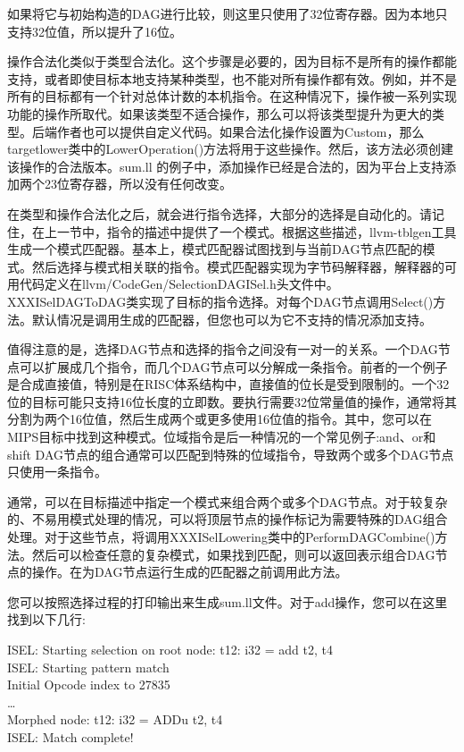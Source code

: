 如果将它与初始构造的DAG进行比较，则这里只使用了32位寄存器。因为本地只支持32位值，所以提升了16位。\par

操作合法化类似于类型合法化。这个步骤是必要的，因为目标不是所有的操作都能支持，或者即使目标本地支持某种类型，也不能对所有操作都有效。例如，并不是所有的目标都有一个针对总体计数的本机指令。在这种情况下，操作被一系列实现功能的操作所取代。如果该类型不适合操作，那么可以将该类型提升为更大的类型。后端作者也可以提供自定义代码。如果合法化操作设置为Custom，那么targetlower类中的LowerOperation()方法将用于这些操作。然后，该方法必须创建该操作的合法版本。sum.ll 的例子中，添加操作已经是合法的，因为平台上支持添加两个23位寄存器，所以没有任何改变。\par

在类型和操作合法化之后，就会进行指令选择，大部分的选择是自动化的。请记住，在上一节中，指令的描述中提供了一个模式。根据这些描述，llvm-tblgen工具生成一个模式匹配器。基本上，模式匹配器试图找到与当前DAG节点匹配的模式。然后选择与模式相关联的指令。模式匹配器实现为字节码解释器，解释器的可用代码定义在llvm/CodeGen/SelectionDAGISel.h头文件中。XXXISelDAGToDAG类实现了目标的指令选择。对每个DAG节点调用Select()方法。默认情况是调用生成的匹配器，但您也可以为它不支持的情况添加支持。\par

值得注意的是，选择DAG节点和选择的指令之间没有一对一的关系。一个DAG节点可以扩展成几个指令，而几个DAG节点可以分解成一条指令。前者的一个例子是合成直接值，特别是在RISC体系结构中，直接值的位长是受到限制的。一个32位的目标可能只支持16位长度的立即数。要执行需要32位常量值的操作，通常将其分割为两个16位值，然后生成两个或更多使用16位值的指令。其中，您可以在MIPS目标中找到这种模式。位域指令是后一种情况的一个常见例子:and、or和shift DAG节点的组合通常可以匹配到特殊的位域指令，导致两个或多个DAG节点只使用一条指令。\par

通常，可以在目标描述中指定一个模式来组合两个或多个DAG节点。对于较复杂的、不易用模式处理的情况，可以将顶层节点的操作标记为需要特殊的DAG组合处理。对于这些节点，将调用XXXISelLowering类中的PerformDAGCombine()方法。然后可以检查任意的复杂模式，如果找到匹配，则可以返回表示组合DAG节点的操作。在为DAG节点运行生成的匹配器之前调用此方法。\par

您可以按照选择过程的打印输出来生成sum.ll文件。对于add操作，您可以在这里找到以下几行:\par

\begin{tcolorbox}[colback=white,colframe=black]
ISEL: Starting selection on root node: t12: i32 = add t2, t4 \\
ISEL: Starting pattern match \\
\hspace*{0.5cm}Initial Opcode index to 27835 \\
\hspace*{0.5cm}… \\
\hspace*{0.5cm}Morphed node: t12: i32 = ADDu t2, t4 \\
ISEL: Match complete!
\end{tcolorbox}

